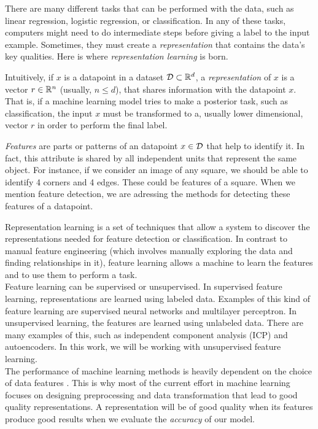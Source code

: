 There are many different tasks that can be performed with the data, such as linear regression, logistic regression, or classification. In any of these tasks, computers might need
to do intermediate steps before giving a label to the input example. Sometimes, they must create a \emph{representation} that 
contains the data's key qualities.  Here is where \emph{representation learning} is born. 


Intuitively, if $x$ is a datapoint in a dataset $\mathcal{D} \subset \mathbb{R}^d$, a \emph{representation} of $x$ is a vector $r \in \mathbb{R}^n$ (usually, $n \leq d$), that shares information with the datapoint $x$. That is, if a machine learning model
tries to make a posterior task, such as classification, the input $x$ must be transformed to a, usually lower dimensional, vector $r$ in order to perform the final label.

\emph{Features} are parts or patterns of an datapoint $x \in \mathcal{D}$ that help to identify it. In fact, this attribute is shared by all independent units that represent the same object. For instance, if we consider an image of any square, we should be able to identify 4 corners and 4 edges. These could be features of a square.
When we mention feature detection, we are adressing the methods for detecting these features of a datapoint.

Representation learning is a set of techniques that allow a system to discover the representations needed for feature detection or classification. 
In contrast to manual feature engineering (which involves manually exploring the data and finding relationships in it), feature learning allows a machine to learn the features and to use them to perform a task.\\

Feature learning can be supervised or unsupervised. In supervised feature learning, representations are learned using labeled data.
Examples of this kind of feature learning are supervised neural networks and multilayer perceptron. In unsupervised learning, the features are learned using unlabeled data. 
There are many examples of this, such as independent component analysis (ICP) and autoencoders. In this work, we will be working with unsupervised feature learning.\\

The performance of machine learning methods is heavily dependent on the choice of data features \citep{bengio_representation_2014}. This is why most of the current 
effort in machine learning focuses on designing preprocessing and data transformation that lead to good quality representations. A representation will be of good quality when its features
produce good results when we evaluate the \emph{accuracy} of our model.\\

